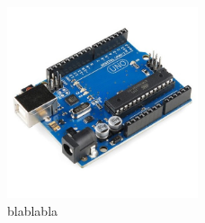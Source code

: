 \documentclass{article}
\begin{document}
\begin{figure}[H]
    \centering
    \includegraphics[width=0.5\textwidth]{Figuras/Arduino.jpg}
    \caption{blablabla}
    \label{fig:Arduino}
\end{figure}
\end{document}
